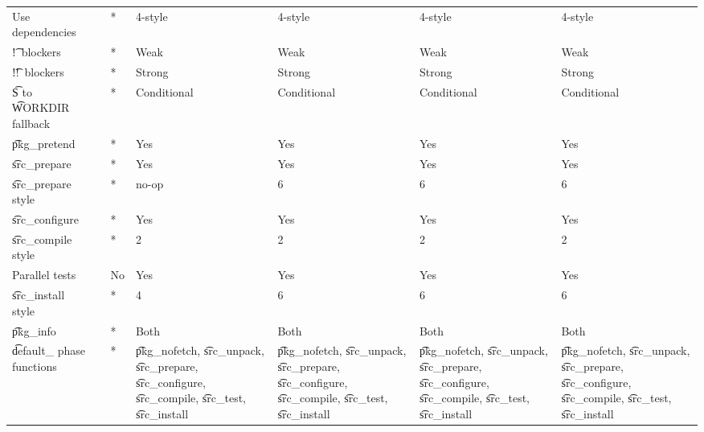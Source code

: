 \begin{landscape}
\begin{longtable}{llP{7.5em}P{7.5em}P{7.5em}P{7.5em}P{7.5em}}
Use dependencies &  &
    * & 4-style & 4-style & 4-style & 4-style \\

\t{!}\ blockers &  &
    * & Weak & Weak & Weak & Weak \\

\t{!!}\ blockers &  &
    * & Strong & Strong & Strong & Strong \\

\t{S} to \t{WORKDIR} fallback &  &
    * & Conditional & Conditional & Conditional & Conditional \\

\t{pkg_pretend} &  &
    * & Yes & Yes & Yes & Yes \\

\t{src_prepare} &  &
    * & Yes & Yes & Yes & Yes \\

\t{src_prepare} style &  &
    * & no-op & 6 & 6 & 6 \\

\t{src_configure} &  &
    * & Yes & Yes & Yes & Yes \\

\t{src_compile} style &  &
    * & 2 & 2 & 2 & 2 \\

Parallel tests &  &
    No & Yes & Yes & Yes & Yes \\

\t{src_install} style &  &
    * & 4 & 6 & 6 & 6 \\

\t{pkg_info} &  &
    * & Both & Both & Both & Both \\

\t{default_} phase functions &  &
    * &
    \t{pkg_nofetch}, \t{src_unpack}, \t{src_prepare}, \t{src_configure},
        \t{src_compile}, \t{src_test}, \t{src_install} &
    \t{pkg_nofetch}, \t{src_unpack}, \t{src_prepare}, \t{src_configure},
        \t{src_compile}, \t{src_test}, \t{src_install} &
    \t{pkg_nofetch}, \t{src_unpack}, \t{src_prepare}, \t{src_configure},
        \t{src_compile}, \t{src_test}, \t{src_install} &
    \t{pkg_nofetch}, \t{src_unpack}, \t{src_prepare}, \t{src_configure},
        \t{src_compile}, \t{src_test}, \t{src_install} \\


\end{longtable}
\end{landscape}

